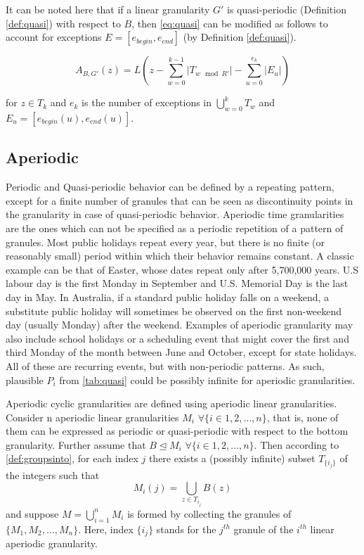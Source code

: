 \documentclass[12pt]{article}
\begin{document}
It can be noted here that if a linear granularity \(G'\) is quasi-periodic (Definition \autoref{def:quasi}) with respect to \(B\), then \autoref{eq:quasi} can be modified as follows to account for exceptions \(E = [e_{begin}, e_{end}]\) (by Definition \autoref{def:quasi}).

\begin{equation}\label{eq6}
A_{B, G'}(z) = L(z - \sum_{w=0}^{k-1}\vert T_{w \mod R'} \vert - \sum_{u=0}^{e_k}\vert E_{u} \vert)
\end{equation}

for \(z \in T_k\) and \(e_k\) is the number of exceptions in \(\bigcup\limits_{w = 0}^{k} T_w\) and \(E_{u} = [e_{begin}(u), e_{end}(u)]\).

\hypertarget{sec:aperiodic-gran-def}{%
\subsection{Aperiodic}\label{sec:aperiodic-gran-def}}

Periodic and Quasi-periodic behavior can be defined by a repeating pattern, except for a finite number of granules that can be seen as discontinuity points in the granularity in case of quasi-periodic behavior. Aperiodic time granularities are the ones which can not be specified as a periodic repetition of a pattern of granules. Most public holidays repeat every year, but there is no finite (or reasonably small) period within which their behavior remains constant. A classic example can be that of Easter, whose dates repeat only after 5,700,000 years. U.S labour day is the first Monday in September and U.S. Memorial Day is the last day in May. In Australia, if a standard public holiday falls on a weekend, a substitute public holiday will sometimes be observed on the first non-weekend day (usually Monday) after the weekend. Examples of aperiodic granularity may also include school holidays or a scheduling event that might cover the first and third Monday of the month between June and October, except for state holidays. All of these are recurring events, but with non-periodic patterns. As such, plausible \(P_i\) from \autoref{tab:quasi} could be possibly infinite for aperiodic granularities.

Aperiodic cyclic granularities are defined using aperiodic linear granularities. Consider n aperiodic linear granularities \(M_i\) \(\forall \{i\in{1, 2, \dots, n\}}\), that is, none of them can be expressed as periodic or quasi-periodic with respect to the bottom granularity. Further assume that \(B \trianglelefteq M_i\) \(\forall \{i\in{1, 2, \dots, n\}}\). Then according to \autoref{def:groupsinto}, for each index \(j\) there exists a (possibly infinite) subset \(T_{\{i_j\}}\) of the integers such that
\begin{equation*}
M_{i}(j) = \bigcup_{z \in T_{i_j}}B(z)
\end{equation*}
and suppose \(M = \bigcup_{i=1}^{n}M_{i}\) is formed by collecting the granules of \(\{M_1, M_2, \dots, M_n\}\). Here, index \({\{i_j\}}\) stands for the \(j^{th}\) granule of the \(i^{th}\) linear aperiodic granularity.
\end{document}

